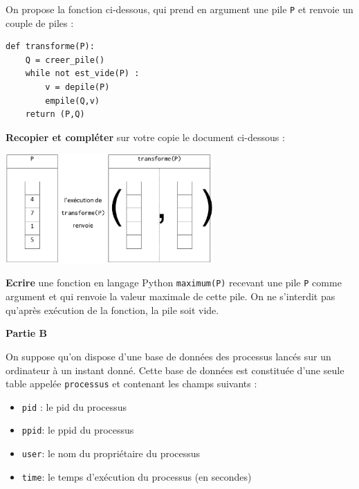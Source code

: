 \documentclass[11pt,a4paper]{article}
\begin{document}
\item On propose la fonction ci-dessous, qui prend en argument une pile {\tt P} et renvoie un couple de piles :
\begin{lstlisting}
def transforme(P):
    Q = creer_pile()
    while not est_vide(P) :
        v = depile(P)
        empile(Q,v)
    return (P,Q)
\end{lstlisting}
\textbf{Recopier et compléter} sur votre copie le document ci-dessous :
\begin{center}
    \includegraphics[width=300px]{TypeBac1-a.eps}
\end{center}
\item \textbf{Ecrire} une fonction en langage Python {\tt maximum(P)} recevant une pile {\tt P} comme argument et qui renvoie la valeur maximale de cette pile. On ne s'interdit pas qu'après exécution de la fonction, la pile soit vide.
\FinListe

\vspace{0.2cm}
\large{\bf  Partie B}

On suppose qu'on dispose d'une base de données des processus lancés sur un ordinateur à un instant donné. Cette base de données est constituée d'une seule table appelée {\tt processus} et contenant les champs suivants :
\begin{itemize}
    \item {\tt pid} : le {\sc pid} du processus
    \item {\tt ppid}: le {\sc ppid} du processus
    \item {\tt user}: le nom du propriétaire du processus
    \item {\tt time}: le temps d'exécution du processus (en secondes)
\end{itemize}
\end{document}
